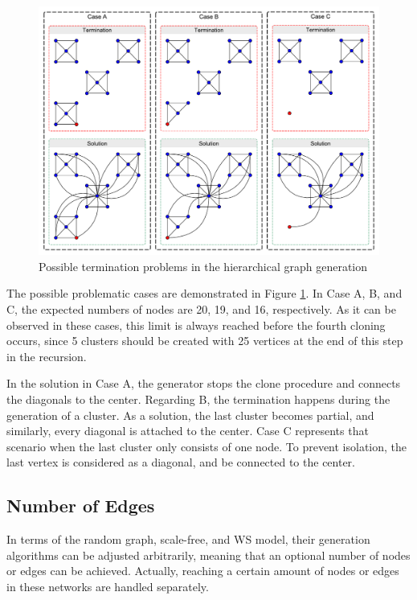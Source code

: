 \begin{figure}[!ht]
	\centering
	\includegraphics[width=150mm, keepaspectratio]{figures/hierarchical.pdf}
	\caption{Possible termination problems in the hierarchical graph generation}
	\label{fig:hierarchical_problems}
\end{figure}

The possible problematic cases are demonstrated in Figure \ref{fig:hierarchical_problems}. In \textsf{Case A}, \textsf{B}, and \textsf{C}, the expected numbers of nodes are 20, 19, and 16, respectively. As it can be observed in these cases, this limit is always reached before the fourth cloning occurs, since 5 clusters should be created with 25 vertices at the end of this step in the recursion.

In the solution in \textsf{Case A}, the generator stops the clone procedure and connects the diagonals to the center. Regarding \textsf{B}, the termination happens during the generation of a cluster. As a solution, the last cluster becomes partial, and similarly, every diagonal is attached to the center. \textsf{Case C} represents that scenario when the last cluster only consists of one node. To prevent isolation, the last vertex is considered as a diagonal, and be connected to the center.

\subsection{Number of Edges}

In terms of the random graph, scale-free, and WS model, their generation algorithms can be adjusted arbitrarily, meaning that an optional number of nodes or edges can be achieved. Actually, reaching a certain amount of nodes or edges in these networks are handled separately.

